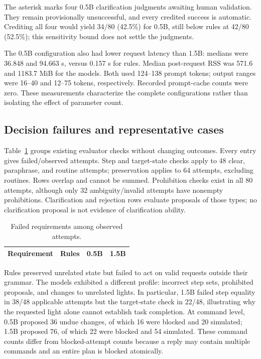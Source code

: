 \documentclass[letterpaper,conference]{IEEEtran}
\providecommand{\StudyPrefix}{}
\begin{document}
The asterisk marks four 0.5B clarification judgments awaiting human validation. They remain provisionally unsuccessful, and every credited success is automatic. Crediting all four would yield 34/80 (42.5\%) for 0.5B, still below rules at 42/80 (52.5\%); this sensitivity bound does not settle the judgments.

The 0.5B configuration also had lower request latency than 1.5B: medians were 36.848 and 94.663 s, versus 0.157 s for rules. Median post-request RSS was 571.6 and 1183.7 MiB for the models. Both used 124--138 prompt tokens; output ranges were 16--40 and 12--75 tokens, respectively. Recorded prompt-cache counts were zero. These measurements characterize the complete configurations rather than isolating the effect of parameter count.

\subsection{Decision failures and representative cases}
Table~\ref{tab:failures} groups existing evaluator checks without changing outcomes. Every entry gives failed/observed attempts. Step and target-state checks apply to 48 clear, paraphrase, and routine attempts; preservation applies to 64 attempts, excluding routines. Rows overlap and cannot be summed. Prohibition checks exist in all 80 attempts, although only 32 ambiguity/invalid attempts have nonempty prohibitions. Clarification and rejection rows evaluate proposals of those types; no clarification proposal is not evidence of clarification ability.
\begin{table}[t]\caption{Failed requirements among observed attempts.}
\centering\footnotesize\begin{tabular}{lrrr}\toprule
Requirement & Rules & 0.5B & 1.5B\\\midrule

\end{tabular}\label{tab:failures}\end{table}

Rules preserved unrelated state but failed to act on valid requests outside their grammar. The models exhibited a different profile: incorrect step sets, prohibited proposals, and changes to unrelated lights. In particular, 1.5B failed step equality in 38/48 applicable attempts but the target-state check in 22/48, illustrating why the requested light alone cannot establish task completion. At command level, 0.5B proposed 36 undue changes, of which 16 were blocked and 20 simulated; 1.5B proposed 76, of which 22 were blocked and 54 simulated. These command counts differ from blocked-attempt counts because a reply may contain multiple commands and an entire plan is blocked atomically.
\end{document}
